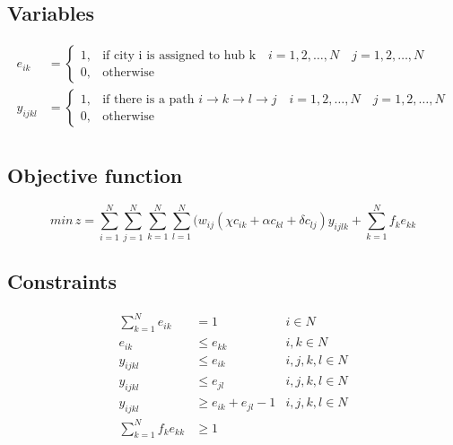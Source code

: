 \documentclass{article}
\begin{document}
\subsection*{Variables}
\begin{align*}
e_{ik} &=
\begin{cases} 
1, & \text{if city i is assigned to hub k} \quad i=1,2,\ldots,N \quad j=1,2,\ldots,N  \\ 
0, & \text{otherwise} 
\end{cases} \\
y_{ijkl} &=
\begin{cases} 
1, & \text{if there is a path } i \rightarrow k \rightarrow l \rightarrow j \quad i=1,2,\ldots,N \quad j=1,2,\ldots,N  \\ 
0, & \text{otherwise} 
\end{cases} \\
\end{align*}

\subsection*{Objective function}
$$min\,z=\sum^N_{i=1}\sum^N_{j=1}\sum^N_{k=1}\sum^N_{l=1}(w_{ij}(\chi c_{ik}+\alpha c_{kl}+\delta c_{lj})y_{ijlk} + \sum^N_{k=1}f_{k}e_{kk}$$

\subsection*{Constraints}
\begin{align*}
\sum^N_{k=1}e_{ik} &= 1 &i \in N \\
e_{ik} & \leq e_{kk} &i,k \in N \\
y_{ijkl} &\leq e_{ik} &i,j,k,l \in N \\
y_{ijkl} &\leq e_{jl} &i,j,k,l \in N \\
y_{ijkl} &\geq e_{ik} + e_{jl} - 1 &i,j,k,l \in N \\
\sum^N_{k=1}f_k e_{kk} &\geq 1
\end{align*}

\newpage
\end{document}
